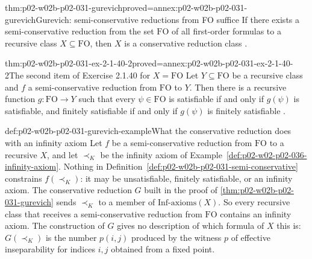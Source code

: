 \begin{hbtheorem}{thm:p02-w02b-p02-031-gurevich}{proved=annex:p02-w02b-p02-031-gurevich}{Gurevich: semi-conservative reductions from FO suffice}
If there exists a semi-conservative reduction from the set \(\mathrm{FO}\) of
all first-order formulas to a recursive class \(X\subseteq\mathrm{FO}\), then
\(X\) is a conservative reduction class
\cite[Sect.~2.1.2, Thm.~2.1.39]{BorgerGradelGurevich1997}.
\end{hbtheorem}

\begin{hbcorollary}{thm:p02-w02b-p02-031-ex-2-1-40-2}{proved=annex:p02-w02b-p02-031-ex-2-1-40-2}{The second item of Exercise 2.1.40 for \(X=\mathrm{FO}\)}
Let \(Y\subseteq\mathrm{FO}\) be a recursive class and \(f\) a
semi-conservative reduction from \(\mathrm{FO}\) to \(Y\).  Then there is a
recursive function \(g:\mathrm{FO}\to Y\) such that every \(\psi\in
\mathrm{FO}\) is satisfiable if and only if \(g(\psi)\) is satisfiable, and
finitely satisfiable if and only if \(g(\psi)\) is finitely satisfiable
\cite[Sect.~2.1.2, Exercise~2.1.40(2)]{BorgerGradelGurevich1997}.
\end{hbcorollary}

\begin{hbexample}{def:p02-w02b-p02-031-gurevich-example}{What the conservative reduction does with an infinity axiom}
Let \(f\) be a semi-conservative reduction from \(\mathrm{FO}\) to a recursive
\(X\), and let \(\prec_K\) be the infinity axiom of
Example~\ref{def:p02-w02-p02-036-infinity-axiom}.  Nothing in
Definition~\ref{def:p02-w02b-p02-031-semi-conservative} constrains
\(f(\prec_K)\): it may be unsatisfiable, finitely satisfiable, or an infinity
axiom.  The conservative reduction \(G\) built in the proof of
\cref{thm:p02-w02b-p02-031-gurevich} sends \(\prec_K\) to a member of
\(\mathrm{Inf\text{-}axioms}(X)\).  So every recursive class that receives a
semi-conservative reduction from \(\mathrm{FO}\) contains an infinity axiom.
The construction of \(G\) gives no description of which formula of \(X\) this
is: \(G(\prec_K)\) is the number \(p(i,j)\) produced by the witness \(p\) of
effective inseparability for indices \(i,j\) obtained from a fixed point.
\end{hbexample}

